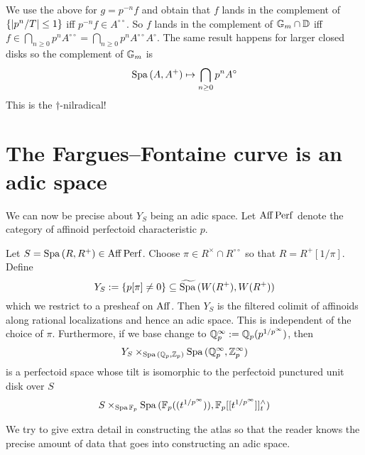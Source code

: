 \documentclass{article}
\begin{document}
\begin{eg}
  We use the above for $g = p^{-n} f$
  and obtain that $f$ lands in the complement of 
  $\left\{\left\vert p^n / T \right\vert \leq 1\right\}$ iff 
  $p^{-n} f \in A^{\circ\circ}$.
  So $f$ lands in the complement of $\mathbb{G}_m \cap \mathbb{D}$
  iff $f \in \bigcap_{n \geq 0} p^{n} A^{\circ\circ} 
  = \bigcap_{n \geq 0} p^{n} A^{\circ\circ} A^{\circ}$.
  The same result happens for larger closed disks
  so the complement of $\mathbb{G}_m$ is 
  \[
    \mathrm{Spa}\,(A , A^+) \mapsto \bigcap_{n \geq 0} p^n A^\circ
  \]
  This is the $\dagger$-nilradical!
\end{eg}

\section{The Fargues--Fontaine curve is an adic space}

We can now be precise about $Y_S$ being an adic space.
Let $\mathrm{Aff}\operatorname{Perf}$ denote 
the category of affinoid perfectoid characteristic $p$.
\begin{prop}
  
  Let $S = \mathrm{Spa}\, (R , R^+) \in \mathrm{Aff}\operatorname{Perf}$.
  Choose $\pi \in R^{\times} \cap R^{\circ\circ}$
  so that $R = R^+[1 / \pi]$.
  Define \[
    Y_S := \left\{p [\pi] \neq 0\right\} \subseteq \widetilde{\mathrm{Spa}\,}(W(R^+) , W(R^+))
  \]
  which we restrict to a presheaf on $\mathrm{Aff}$.
  Then $Y_S$ is the filtered colimit of
  affinoids along rational localizations and hence an adic space.
  This is independent of the choice of $\pi$.
  Furthermore,
  if we base change to $\mathbb{Q}_p^\infty := \mathbb{Q}_p(p^{1 / p^\infty})$,
  then \[
    Y_S \times_{\mathrm{Spa}\,(\mathbb{Q}_p , \mathbb{Z}_p)} \mathrm{Spa}\,(\mathbb{Q}_p^\infty , \mathbb{Z}_p^\infty)
  \]
  is a perfectoid space whose tilt is isomorphic to 
  the perfectoid punctured unit disk over $S$
  \[
    S \times_{\mathrm{Spa}\, \mathbb{F}_p} 
    \mathrm{Spa}\, (\mathbb{F}_p((t^{1 / p^\infty})) , \mathbb{F}_p[[t^{1 / p^\infty}]]^\wedge_t)
  \]
\end{prop}
We try to give extra detail in constructing the atlas 
so that the reader knows 
the precise amount of data that goes into constructing an adic space.
\end{document}
